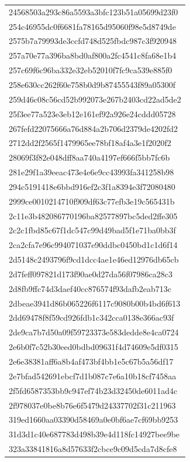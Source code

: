 \begin{tabular}{l}
24568503a293c86a5593a3bfc123b51a05699d23f0 \\
254c46955dc0f6681fa78165d95060f98e5d8749de \\
2575b7a79993de3ccfd748d525fbdc987c3f920948 \\
257a70e77a396ba8bd0af800a2fc4541c8fa68e1b4 \\
257c69f6c96ba332e32eb52010f7fc9ca539e885f0 \\
258e630cc262f60e758b0d9b87455543f89a05300f \\
259d46c08c56cd52b992073e267b2403cd22ad5de2 \\
25f3ee77a523e3eb12e161ef92a926e24cddd05728 \\
267fefd22075666a76d884a2b706d2379de4202fd2 \\
2712dd2f2565f1479965ee78bf18af4a3e1f2020f2 \\
28069f3f82e048dff8aa740a4197ef666f5bb7fc6b \\
281e29f1a39eeac473e4e6e9cc43993fa341258b98 \\
294c5191418e6bbd916ef2c3f1a8394e3f72080480 \\
2999ce0010214710f909df63c77efb3e19c565431b \\
2c11e3b482086770196ba82577897bc5ded2ffe305 \\
2c2c1fbd85c67f1dc547c99d49bad5f1e71ba0bb3f \\
2ca2cfa7e96c994071037e90ddbc0450bd1c1d6f14 \\
2d5148c2493796f9cd1dcc4ae1e46ed12976db65cb \\
2d7feff097821d173f90ae0d27da56f07986ca28c3 \\
2d8fb9ffc74d3daef40cc876574f93dafb2eab713c \\
2dbeae3941d86b065226f6117c9080b00b4bd6f613 \\
2dd69478f8f59cd926fdb1c342cca0138e366ac93f \\
2de9ca7b7d50a09f59723373e583dedde8e4ca0724 \\
2e6b0f7c52b30eed0bdbd09631f4d74609e5df0315 \\
2e6e38381aff6a8b4af473bf4bb1e5c67b5a56df17 \\
2e7bfad542691ebcf7d1b087c7e6a10b18cf7458aa \\
2f5fd6587353bb9c947ef74b23d32450de6011ad4c \\
2f978037e0be8b76e6f5479d24337702f31c211963 \\
319ed1660aa03390d58469a0e0bf6ae7cf69bb9253 \\
31d3d1c40e687783d498b39e4d118fc14927bee9be \\
323a33841816a8d57633f2cbce9c09d5cda7d8cfe8 \\

\end{tabular}
